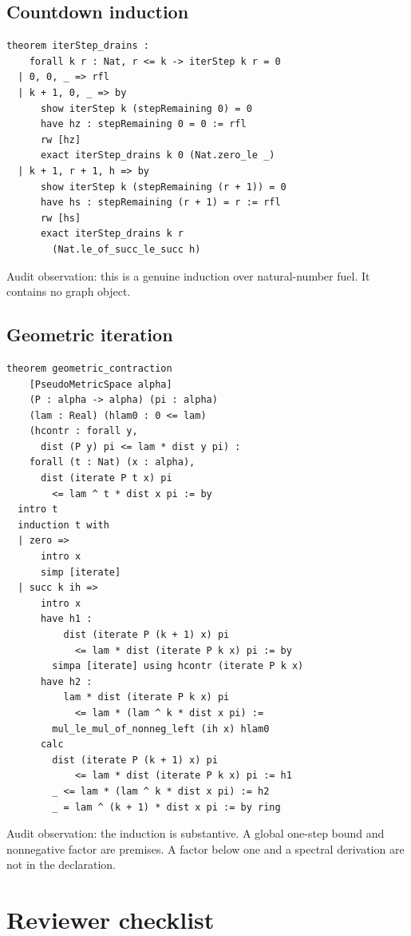 \documentclass[10pt,letterpaper]{article}
\theoremstyle{definition}
\begin{document}
\subsection{Countdown induction}
\begin{lstlisting}[language={}]
theorem iterStep_drains :
    forall k r : Nat, r <= k -> iterStep k r = 0
  | 0, 0, _ => rfl
  | k + 1, 0, _ => by
      show iterStep k (stepRemaining 0) = 0
      have hz : stepRemaining 0 = 0 := rfl
      rw [hz]
      exact iterStep_drains k 0 (Nat.zero_le _)
  | k + 1, r + 1, h => by
      show iterStep k (stepRemaining (r + 1)) = 0
      have hs : stepRemaining (r + 1) = r := rfl
      rw [hs]
      exact iterStep_drains k r
        (Nat.le_of_succ_le_succ h)
\end{lstlisting}
Audit observation: this is a genuine induction over natural-number fuel. It
contains no graph object.

\subsection{Geometric iteration}
\begin{lstlisting}[language={},basicstyle=\ttfamily\scriptsize]
theorem geometric_contraction
    [PseudoMetricSpace alpha]
    (P : alpha -> alpha) (pi : alpha)
    (lam : Real) (hlam0 : 0 <= lam)
    (hcontr : forall y,
      dist (P y) pi <= lam * dist y pi) :
    forall (t : Nat) (x : alpha),
      dist (iterate P t x) pi
        <= lam ^ t * dist x pi := by
  intro t
  induction t with
  | zero =>
      intro x
      simp [iterate]
  | succ k ih =>
      intro x
      have h1 :
          dist (iterate P (k + 1) x) pi
            <= lam * dist (iterate P k x) pi := by
        simpa [iterate] using hcontr (iterate P k x)
      have h2 :
          lam * dist (iterate P k x) pi
            <= lam * (lam ^ k * dist x pi) :=
        mul_le_mul_of_nonneg_left (ih x) hlam0
      calc
        dist (iterate P (k + 1) x) pi
            <= lam * dist (iterate P k x) pi := h1
        _ <= lam * (lam ^ k * dist x pi) := h2
        _ = lam ^ (k + 1) * dist x pi := by ring
\end{lstlisting}
Audit observation: the induction is substantive. A global one-step bound and
nonnegative factor are premises. A factor below one and a spectral derivation
are not in the declaration.

\section{Reviewer checklist}\label{app:checklist}
\end{document}
